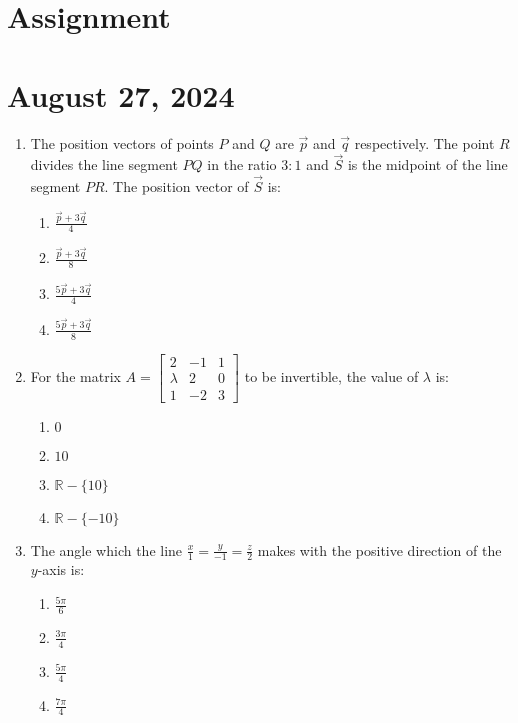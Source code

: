 \documentclass{article}
\providecommand{\myvec}[1]{\ensuremath{\begin{bmatrix}#1\end{bmatrix}}}
\begin{document}
\begin{center}
    \section*{Assignment}
    \section*{August 27, 2024}
\end{center}
\vspace*{\fill} %



\begin{enumerate}
    \item The position vectors of points $P$ and $Q$ are $\vec{p}$ and $\vec{q}$ respectively. The point $R$ divides the line segment $PQ$ in the ratio $3:1$ and $\vec{S}$ is the midpoint of the line segment $PR$. The position vector of $\vec{S}$ is:
    \begin{enumerate}[label=(\alph*)]
        \item $\frac{\vec{p} + 3\vec{q}}{4}$
        \item $\frac{\vec{p} + 3\vec{q}}{8}$
        \item $\frac{5\vec{p} + 3\vec{q}}{4}$
        \item $\frac{5\vec{p} + 3\vec{q}}{8}$
    \end{enumerate}

    \item For the matrix $A = \myvec{2 & -1 & 1 \\ \lambda & 2 & 0 \\ 1 & -2 & 3}$ to be invertible, the value of $\lambda$ is:
    \begin{enumerate}[label=(\alph*)]
        \item $0$
        \item $10$
        \item $\mathbb{R} - \{10\}$
        \item $\mathbb{R} - \{-10\}$
    \end{enumerate}

    \item The angle which the line $\frac{x}{1} = \frac{y}{-1} = \frac{z}{2}$ makes with the positive direction of the $y$-axis is:
    \begin{enumerate}[label=(\alph*)]
        \item $\frac{5\pi}{6}$
        \item $\frac{3\pi}{4}$
        \item $\frac{5\pi}{4}$
        \item $\frac{7\pi}{4}$
    \end{enumerate}
    

\end{enumerate}
\end{document}

